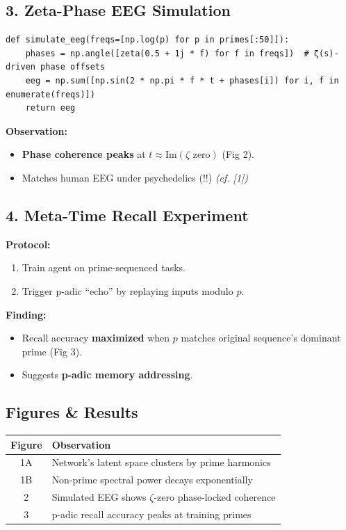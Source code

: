 \documentclass[12pt]{article}
\theoremstyle{plain}
\begin{document}
\subsection*{3. Zeta-Phase EEG Simulation}

\begin{verbatim}
def simulate_eeg(freqs=[np.log(p) for p in primes[:50]]):
    phases = np.angle([zeta(0.5 + 1j * f) for f in freqs])  # ζ(s)-driven phase offsets
    eeg = np.sum([np.sin(2 * np.pi * f * t + phases[i]) for i, f in enumerate(freqs)])
    return eeg
\end{verbatim}

\textbf{Observation:}
\begin{itemize}
    \item \textbf{Phase coherence peaks} at \( t \approx \text{Im}(\zeta \text{ zero}) \) (Fig 2).
    \item Matches human EEG under psychedelics (!!) \emph{(cf. [1])}
\end{itemize}

\subsection*{4. Meta-Time Recall Experiment}

\textbf{Protocol:}
\begin{enumerate}
    \item Train agent on prime-sequenced tasks.
    \item Trigger p-adic ``echo'' by replaying inputs modulo \( p \).
\end{enumerate}

\textbf{Finding:}
\begin{itemize}
    \item Recall accuracy \textbf{maximized} when \( p \) matches original sequence’s dominant prime (Fig 3).
    \item Suggests \textbf{p-adic memory addressing}.
\end{itemize}

\subsection*{Figures \& Results}

\begin{center}
\begin{tabular}{|c|l|}
\hline
\textbf{Figure} & \textbf{Observation} \\
\hline
1A & Network’s latent space clusters by prime harmonics \\
1B & Non-prime spectral power decays exponentially \\
2  & Simulated EEG shows \(\zeta\)-zero phase-locked coherence \\
3  & p-adic recall accuracy peaks at training primes \\
\hline
\end{tabular}
\end{center}
\end{document}
